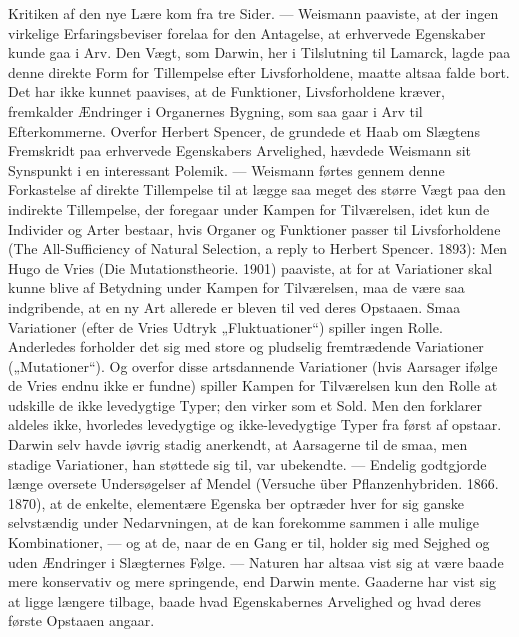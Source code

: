 \documentclass[12pt,a4paper,openany]{book}
\newcommand{\opage}[1]{\marginnote{\footnotesize\textit{[#1]}}}
\begin{document}
Kritiken af den nye Lære kom fra tre Sider. --- Weismann paaviste,
at der ingen virkelige Erfaringsbeviser forelaa for den Antagelse,
at erhvervede Egenskaber kunde gaa i Arv. Den Vægt, som
Darwin, her i Tilslutning til Lamarck, lagde paa denne direkte Form
for Tillempelse efter Livsforholdene, maatte altsaa falde bort. Det
har ikke kunnet paavises, at de Funktioner, Livsforholdene kræver,
fremkalder Ændringer i Organernes Bygning, som saa gaar i Arv til
Efterkommerne. Overfor Herbert Spencer, de grundede et Haab om
Slægtens Fremskridt paa erhvervede Egenskabers Arvelighed, hævdede
Weismann sit Synspunkt i en interessant Polemik. --- Weismann
førtes gennem denne Forkastelse af direkte Tillempelse til at
lægge saa meget des større Vægt paa den indirekte Tillempelse, der
foregaar under Kampen for Tilværelsen, idet kun de Individer og
Arter bestaar, hvis Organer og Funktioner passer til Livsforholdene
(The All-Sufficiency of Natural Selection, a reply to Herbert Spencer.
1893): Men Hugo de Vries (Die Mutationstheorie. 1901) paaviste,
at for at Variationer skal kunne blive af Betydning under
Kampen for Tilværelsen, maa de være saa indgribende, at en ny
Art allerede er bleven til ved deres Opstaaen. Smaa Variationer
(efter de Vries Udtryk „Fluktuationer“) spiller ingen Rolle. Anderledes
forholder det sig med store og pludselig fremtrædende Variationer
(„Mutationer“). Og overfor disse artsdannende Variationer (hvis
Aarsager ifølge de Vries endnu ikke er fundne) spiller Kampen for
Tilværelsen kun den Rolle at udskille de ikke levedygtige Typer; den
virker som et Sold. Men den forklarer aldeles ikke, hvorledes levedygtige
og ikke-levedygtige Typer fra først af opstaar. Darwin selv
havde iøvrig stadig anerkendt, at Aarsagerne til de smaa, men stadige
Variationer, han støttede sig til, var ubekendte. --- Endelig godtgjorde
længe oversete Undersøgelser af Mendel (Versuche über
Pflanzenhybriden. 1866. 1870), at de enkelte, elementære Egenska%
\opage{41}ber optræder hver for sig ganske selvstændig under Nedarvningen, at
de kan forekomme sammen i alle mulige Kombinationer, --- og at
de, naar de en Gang er til, holder sig med Sejghed og uden Ændringer
i Slægternes Følge. --- Naturen har altsaa vist sig at være baade
mere konservativ og mere springende, end Darwin mente. Gaaderne
har vist sig at ligge længere tilbage, baade hvad Egenskabernes Arvelighed
og hvad deres første Opstaaen angaar.
\end{document}
